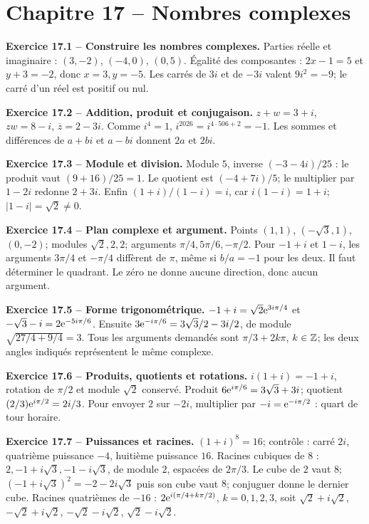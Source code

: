 \chapter*{Chapitre 17 -- Nombres complexes}
\begin{answerbox}
\textbf{Exercice 17.1 -- Construire les nombres complexes.} Parties réelle et imaginaire : $(3,-2)$, $(-4,0)$, $(0,5)$. Égalité des composantes : $2x-1=5$ et $y+3=-2$, donc $x=3,y=-5$. Les carrés de $3i$ et de $-3i$ valent $9i^2=-9$; le carré d'un réel est positif ou nul.\par
\textbf{Exercice 17.2 -- Addition, produit et conjugaison.} $z+w=3+i$, $zw=8-i$, $\overline z=2-3i$. Comme $i^4=1$, $i^{2026}=i^{4\cdot506+2}=-1$. Les sommes et différences de $a+bi$ et $a-bi$ donnent $2a$ et $2bi$.\par
\textbf{Exercice 17.3 -- Module et division.} Module $5$, inverse $(-3-4i)/25$ : le produit vaut $(9+16)/25=1$. Le quotient est $(-4+7i)/5$; le multiplier par $1-2i$ redonne $2+3i$. Enfin $(1+i)/(1-i)=i$, car $i(1-i)=1+i$; $|1-i|=\sqrt2\ne0$.\par
\textbf{Exercice 17.4 -- Plan complexe et argument.} Points $(1,1)$, $(-\sqrt3,1)$, $(0,-2)$; modules $\sqrt2,2,2$; arguments $\pi/4,5\pi/6,-\pi/2$. Pour $-1+i$ et $1-i$, les arguments $3\pi/4$ et $-\pi/4$ diffèrent de $\pi$, même si $b/a=-1$ pour les deux. Il faut déterminer le quadrant. Le zéro ne donne aucune direction, donc aucun argument.\par
\textbf{Exercice 17.5 -- Forme trigonométrique.} $-1+i=\sqrt2\mathrm e^{3i\pi/4}$ et $-\sqrt3-i=2\mathrm e^{-5i\pi/6}$. Ensuite $3\mathrm e^{-i\pi/6}=3\sqrt3/2-3i/2$, de module $\sqrt{27/4+9/4}=3$. Tous les arguments demandés sont $\pi/3+2k\pi$, $k\in\mathbb{Z}$; les deux angles indiqués représentent le même complexe.\par
\textbf{Exercice 17.6 -- Produits, quotients et rotations.} $i(1+i)=-1+i$, rotation de $\pi/2$ et module $\sqrt2$ conservé. Produit $6\mathrm e^{i\pi/6}=3\sqrt3+3i$; quotient $(2/3)\mathrm e^{i\pi/2}=2i/3$. Pour envoyer $2$ sur $-2i$, multiplier par $-i=\mathrm e^{-i\pi/2}$ : quart de tour horaire.\par
\textbf{Exercice 17.7 -- Puissances et racines.} $(1+i)^8=16$; contrôle : carré $2i$, quatrième puissance $-4$, huitième puissance $16$. Racines cubiques de $8$ : $2,-1+i\sqrt3,-1-i\sqrt3$, de module $2$, espacées de $2\pi/3$. Le cube de $2$ vaut $8$; $(-1+i\sqrt3)^2=-2-2i\sqrt3$ puis son cube vaut $8$; conjuguer donne le dernier cube. Racines quatrièmes de $-16$ : $2\mathrm e^{i(\pi/4+k\pi/2)}$, $k=0,1,2,3$, soit $\sqrt2+i\sqrt2$, $-\sqrt2+i\sqrt2$, $-\sqrt2-i\sqrt2$, $\sqrt2-i\sqrt2$.\par

\end{answerbox}
